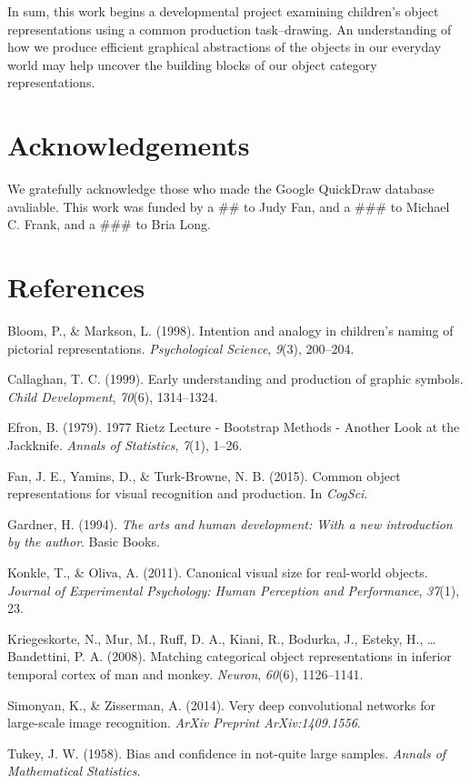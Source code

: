 \documentclass[10pt, letterpaper]{article}
\begin{document}
In sum, this work begins a developmental project examining children's
object representations using a common production task--drawing. An
understanding of how we produce efficient graphical abstractions of the
objects in our everyday world may help uncover the building blocks of
our object category representations.

\section{Acknowledgements}\label{acknowledgements}

We gratefully acknowledge those who made the Google QuickDraw database
avaliable. This work was funded by a \#\# to Judy Fan, and a \#\#\# to
Michael C. Frank, and a \#\#\# to Bria Long.

\section{References}\label{references}

\setlength{\parindent}{-0.1in} \setlength{\leftskip}{0.125in} \noindent

\hypertarget{refs}{}
\hypertarget{ref-bloom1998intention}{}
Bloom, P., \& Markson, L. (1998). Intention and analogy in children's
naming of pictorial representations. \emph{Psychological Science},
\emph{9}(3), 200--204.

\hypertarget{ref-callaghan1999early}{}
Callaghan, T. C. (1999). Early understanding and production of graphic
symbols. \emph{Child Development}, \emph{70}(6), 1314--1324.

\hypertarget{ref-Efron:1979ts}{}
Efron, B. (1979). 1977 Rietz Lecture - Bootstrap Methods - Another Look
at the Jackknife. \emph{Annals of Statistics}, \emph{7}(1), 1--26.

\hypertarget{ref-fan2015common}{}
Fan, J. E., Yamins, D., \& Turk-Browne, N. B. (2015). Common object
representations for visual recognition and production. In \emph{CogSci}.

\hypertarget{ref-gardner1994arts}{}
Gardner, H. (1994). \emph{The arts and human development: With a new
introduction by the author}. Basic Books.

\hypertarget{ref-konkle2011canonical}{}
Konkle, T., \& Oliva, A. (2011). Canonical visual size for real-world
objects. \emph{Journal of Experimental Psychology: Human Perception and
Performance}, \emph{37}(1), 23.

\hypertarget{ref-kriegeskorte2008matching}{}
Kriegeskorte, N., Mur, M., Ruff, D. A., Kiani, R., Bodurka, J., Esteky,
H., \ldots{} Bandettini, P. A. (2008). Matching categorical object
representations in inferior temporal cortex of man and monkey.
\emph{Neuron}, \emph{60}(6), 1126--1141.

\hypertarget{ref-simonyan2014very}{}
Simonyan, K., \& Zisserman, A. (2014). Very deep convolutional networks
for large-scale image recognition. \emph{ArXiv Preprint
ArXiv:1409.1556}.

\hypertarget{ref-Tukey:1958wn}{}
Tukey, J. W. (1958). Bias and confidence in not-quite large samples.
\emph{Annals of Mathematical Statistics}.
\end{document}
